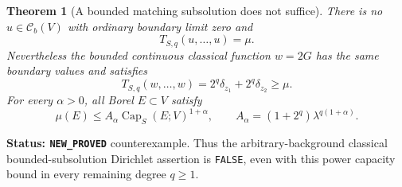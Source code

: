 \documentclass[11pt,a4paper]{article}
\numberwithin{equation}{section}
\newtheorem{theorem}{Theorem}[section]
\theoremstyle{definition}
\theoremstyle{remark}
\begin{document}
\begin{theorem}[A bounded matching subsolution does not suffice]
\label{thm:r3-relative-dirichlet-no-classical}
There is no $u\in\mathcal C_b(V)$ with ordinary boundary limit zero
and
\[
 T_{S,q}(u,\ldots,u)=\mu.
\]
Nevertheless the bounded continuous classical function $w=2G$ has
the same boundary values and satisfies
\begin{equation}
 T_{S,q}(w,\ldots,w)
       =2^q\delta_{z_1}+2^q\delta_{z_2}\geq\mu.
 \label{eq:r3-relative-matching-subsolution}
\end{equation}
For every $\alpha>0$, all Borel $E\subset V$ satisfy
\begin{equation}
 \mu(E)\leq A_\alpha\operatorname{Cap}_S(E;V)^{1+\alpha},
 \qquad A_\alpha=(1+2^q)\lambda^{q(1+\alpha)}.
 \label{eq:r3-relative-power-datum}
\end{equation}
\end{theorem}

\noindent\textbf{Status: \texttt{NEW\_PROVED}} counterexample.
Thus the arbitrary-background classical bounded-subsolution
Dirichlet assertion is \texttt{FALSE}, even with this power
capacity bound in every remaining degree $q\geq1$.
\end{document}
